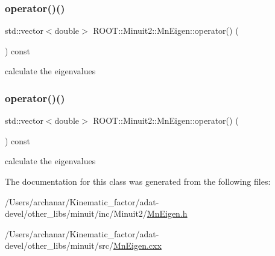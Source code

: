 \subsubsection{\texorpdfstring{operator()()}{operator()()}\hspace{0.1cm}{\footnotesize\ttfamily [2/3]}}
{\footnotesize\ttfamily std\+::vector$<$double$>$ R\+O\+O\+T\+::\+Minuit2\+::\+Mn\+Eigen\+::operator() (\begin{DoxyParamCaption}\item[{const \mbox{\hyperlink{classROOT_1_1Minuit2_1_1MnUserCovariance}{Mn\+User\+Covariance}} \&}]{ }\end{DoxyParamCaption}) const}



calculate the eigenvalues 

\mbox{\label{classROOT_1_1Minuit2_1_1MnEigen_aba021c8f81549aae00ad600c3d3c2f93}} 
\subsubsection{\texorpdfstring{operator()()}{operator()()}\hspace{0.1cm}{\footnotesize\ttfamily [3/3]}}
{\footnotesize\ttfamily std\+::vector$<$double$>$ R\+O\+O\+T\+::\+Minuit2\+::\+Mn\+Eigen\+::operator() (\begin{DoxyParamCaption}\item[{const \mbox{\hyperlink{classROOT_1_1Minuit2_1_1MnUserCovariance}{Mn\+User\+Covariance}} \&}]{ }\end{DoxyParamCaption}) const}



calculate the eigenvalues 



The documentation for this class was generated from the following files\+:\begin{DoxyCompactItemize}
\item 
/\+Users/archanar/\+Kinematic\+\_\+factor/adat-\/devel/other\+\_\+libs/minuit/inc/\+Minuit2/\mbox{\hyperlink{adat-devel_2other__libs_2minuit_2inc_2Minuit2_2MnEigen_8h}{Mn\+Eigen.\+h}}\item 
/\+Users/archanar/\+Kinematic\+\_\+factor/adat-\/devel/other\+\_\+libs/minuit/src/\mbox{\hyperlink{adat-devel_2other__libs_2minuit_2src_2MnEigen_8cxx}{Mn\+Eigen.\+cxx}}\end{DoxyCompactItemize}
